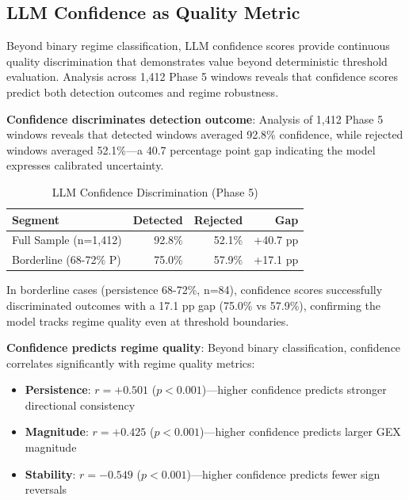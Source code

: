 \subsection{LLM Confidence as Quality Metric}
\label{sec:confidence_metric}

\vspace{0.2cm}

Beyond binary regime classification, LLM confidence scores provide continuous quality discrimination that demonstrates value beyond deterministic threshold evaluation. Analysis across 1,412 Phase 5 windows reveals that confidence scores predict both detection outcomes and regime robustness.

\vspace{0.2cm}

\noindent\textbf{Confidence discriminates detection outcome}: Analysis of 1,412 Phase 5 windows reveals that detected windows averaged 92.8\% confidence, while rejected windows averaged 52.1\%---a 40.7 percentage point gap indicating the model expresses calibrated uncertainty.

\begin{table}[ht]
\centering
\caption{LLM Confidence Discrimination (Phase 5)}
\begin{tabular}{lrrr}
\toprule
\textbf{Segment} & \textbf{Detected} & \textbf{Rejected} & \textbf{Gap} \\
\midrule
Full Sample (n=1,412) & 92.8\% & 52.1\% & +40.7 pp \\
Borderline (68-72\% P) & 75.0\% & 57.9\% & +17.1 pp \\
\bottomrule
\end{tabular}
\end{table}

In borderline cases (persistence 68-72\%, n=84), confidence scores successfully discriminated outcomes with a 17.1 pp gap (75.0\% vs 57.9\%), confirming the model tracks regime quality even at threshold boundaries.

\vspace{0.2cm}

\noindent\textbf{Confidence predicts regime quality}: Beyond binary classification, confidence correlates significantly with regime quality metrics:

\vspace{0.1cm}

\begin{itemize}
\item \textbf{Persistence}: $r = +0.501$ ($p < 0.001$)---higher confidence predicts stronger directional consistency
\item \textbf{Magnitude}: $r = +0.425$ ($p < 0.001$)---higher confidence predicts larger GEX magnitude
\item \textbf{Stability}: $r = -0.549$ ($p < 0.001$)---higher confidence predicts fewer sign reversals
\end{itemize}

